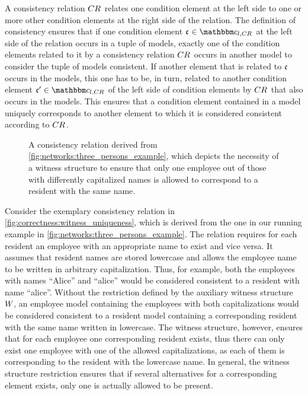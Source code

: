 A consistency relation $\consistencyrelation{CR}{}$ relates one condition element at the left side to one or more other condition elements at the right side of the relation.
The definition of consistency ensures that if one condition element $\conditionelement{c}{} \in \condition{c}{l,\consistencyrelation{CR}{}}$ at the left side of the relation occurs in a tuple of models, exactly one of the condition elements related to it by a consistency relation $\consistencyrelation{CR}{}$ occurs in another model to consider the tuple of models consistent.
If another element that is related to $\conditionelement{c}{}$ occurs in the models, this one has to be, in turn, related to another condition element $\conditionelement{c}{}' \in \condition{c}{l,\consistencyrelation{CR}{}}$ of the left side of condition elements by $\consistencyrelation{CR}{}$ that also occurs in the models.
This ensures that a condition element contained in a model uniquely corresponds to another element to which it is considered consistent according to $\consistencyrelation{CR}{}$.

\begin{figure}
    \centering
    
    \caption[Example for necessity of a witness structure]{A consistency relation derived from \autoref{fig:networks:three_persons_example}, which depicts the necessity of a witness structure to ensure that only one employee out of those with differently capitalized names is allowed to correspond to a resident with the same name.}
    \label{fig:correctness:witness_uniqueness}
\end{figure}

Consider the exemplary consistency relation in \autoref{fig:correctness:witness_uniqueness}, which is derived from the one in our running example in \autoref{fig:networks:three_persons_example}.
The relation requires for each resident an employee with an appropriate name to exist and vice versa.
It assumes that resident names are stored lowercase and allows the employee name to be written in arbitrary capitalization.
Thus, for example, both the employees with names \enquote{Alice} and \enquote{alice} would be considered consistent to a resident with name \enquote{alice}.
Without the restriction defined by the auxiliary witness structure $\consistencyrelation{W}{}$, an employee model containing the employees with both capitalizations would be considered consistent to a resident model containing a corresponding resident with the same name written in lowercase.
The witness structure, however, ensures that for each employee one corresponding resident exists, thus there can only exist one employee with one of the allowed capitalizations, as each of them is corresponding to the resident with the lowercase name.
In general, the witness structure restriction ensures that if several alternatives for a corresponding element exists, only one is actually allowed to be present.

